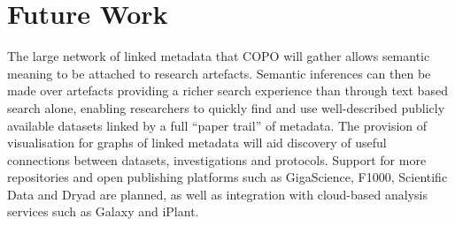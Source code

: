 \documentclass[runningheads,a4paper]{llncs}
\begin{document}
\vspace*{-0.1in}
\section{Future Work}
\vspace*{-0.1in}
The large network of linked metadata that COPO will gather allows
semantic meaning to be attached to research artefacts. Semantic
inferences can then be made over artefacts providing a richer search
experience than through text based search alone, enabling researchers
to quickly find and use well-described publicly available datasets
linked by a full ``paper trail'' of metadata. The provision of
visualisation for graphs of linked metadata will aid discovery of
useful connections between datasets, investigations and
protocols. Support for more repositories and open publishing platforms
such as GigaScience, F1000, Scientific Data and Dryad are planned, as
well as integration with cloud-based analysis services such as Galaxy
and iPlant.
\end{document}
